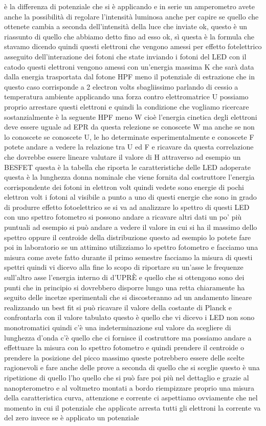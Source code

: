 è la differenza di potenziale che si è applicando e in serie un amperometro avete anche la possibilità di regolare l'intensità luminosa anche per capire se quello che ottenete cambia a seconda dell'intensità della luce che inviate ok, questo è un riassunto di quello che abbiamo detto fino ad esso ok, sì questa è la formula che stavamo dicendo quindi questi elettroni che vengono amessi per effetto fotelettrico asseguito dell'interazione dei fotoni che state inviando i fotoni del LED con il catodo questi elettroni vengono amessi con un'energia massima K che sarà data dalla energia trasportata dal fotone HPF meno il potenziale di estrazione che in questo caso corrisponde a 2 electron volts sbagliissimo parlando di cessio a temperatura ambiente applicando una forza contro elettromatrice U possiamo proprio arrestare questi elettroni e quindi la condizione che vogliamo ricercare sostanzialmente è la seguente HPF meno W cioè l'energia cinetica degli elettroni deve essere uguale ad EPR da questa relezione se conoscete W ma anche se non lo conoscete se conoscete U, le ho determinate esperimentalmente e conoscete F potete andare a vedere la relazione tra U ed F e ricavare da questa correlazione che dovrebbe essere lineare valutare il valore di H attraverso ad esempio un BESFET questa è la tabella che riporta le caratteristiche delle LED adoperate questa è la lunghezza donna nominale che viene fornita dal costruttore l'energia corrispondente dei fotoni in elettron volt quindi vedete sono energie di pochi elettron volt i fotoni al visibile a punto a uno di questi energie che sono in grado di produrre effetto fotoelettrico se si va ad analizzare lo spettro di questi LED con uno spettro fotometro si possono andare a ricavare altri dati un po' più puntuali ad esempio si può andare a vedere il valore in cui si ha il massimo dello spettro oppure il centroide della distribuzione questo ad esempio lo potete fare poi in laboratorio se un attimino utilizziamo lo spettro fotometro e facciamo una misura come avete fatto durante il primo semestre facciamo la misura di questi spettri quindi vi dicevo alla fine lo scopo di riportare su un'asse le frequenze sull'altro asse l'energia interno di d'UPRÈ e quello che si ottengono sono dei punti che in principio si dovrebbero disporre lungo una retta chiaramente ha seguito delle incetze sperimentali che si discosteranno ad un andamento lineare realizzando un best fit si può ricavare il valore della costante di Planck e confrontarla con il valore tabulato questo è quello che vi dicevo i LED non sono monotromatici quindi c'è una indeterminazione sul valore da scegliere di lunghezza d'onda c'è quello che ci fornisce il costruttore ma possiamo andare a effettuare la misura con lo spettro fotometro e quindi prendere il centroide o prendere la posizione del picco massimo queste potrebbero essere delle scelte ragionevoli e fare anche delle prove a seconda di quello che si sceglie questo è una ripetizione di quello l'ho quello che si può fare poi più nel dettaglio e grazie al nanopterometro e al voltmetro montati a bordo riempizzare proprio una misura della caratteristica curva, attenzione e corrente ci aspettiamo ovviamente che nel momento in cui il potenziale che applicate arresta tutti gli elettroni la corrente va del zero invece se è applicato un potenziale 